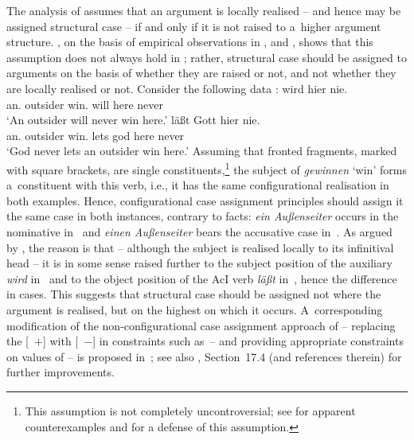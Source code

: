 \documentclass[output=paper
	        ,collection
	        ,collectionchapter
 	        ,biblatex
                ,babelshorthands
                ,newtxmath
                ,draftmode
                ,colorlinks, citecolor=brown
]{./langsci/langscibook}
\begin{document}
The analysis of \citet{prze:96,Prze99b,Prze99} assumes that an argument is locally realised – and hence may be assigned structural case – if and only if it is not raised to a~higher argument structure.  \citet{Meurers99c,Meurers99b}, on the basis of empirical observations in \citet{Haider90a}, \citet{Grewendorf94a} and \citet{Mueller97c-Eng}, shows that this assumption does not always hold in ; rather, structural case should be assigned to arguments on the basis of whether they are raised or not, and not whether they are locally realised or not.  Consider the following data \citep[294]{Meurers99c}:
\eal
\ex\label{win:ss}
 wird hier nie. \\
    \phtm{[}an.\NOM{} outsider win.\INF{} will here never\\
\glt `An outsider will never win here.'
\ex\label{win:so}
 läßt Gott hier nie. \\
    \phtm{[}an.\ACC{} outsider win.\INF{} lets god here never\\
\glt `God never lets an outsider win here.'
\zl
Assuming that fronted fragments, marked with square brackets, are single constituents,\footnote{This assumption is not completely uncontroversial; see \citet[100–101]{Kiss94} for apparent counterexamples and \citet{Mueller2003b,Mueller2005d,MuellerGS} for a defense of this assumption.} the subject of \emph{gewinnen} `win’ forms a~constituent with this verb, i.e., it has the same configurational realisation in both examples.  Hence, configurational case assignment principles should assign it the same case in both instances, contrary to facts: \emph{ein Au\ss{}enseiter} occurs in the nominative in~ and \emph{einen Au\ss{}enseiter} bears the accusative case in~.  As argued by \citet{Meurers99c,Meurers99b}, the reason is that – although the subject is realised locally to its infinitival head – it is in some sense raised further to the subject position of the auxiliary \emph{wird} in~ and to the object position of the AcI verb \emph{l\"a\ss{}t} in~, hence the difference in cases.  This suggests that structural case should be assigned not where the argument is realised, but on the highest  on which it occurs.  A~corresponding modification of the non-configurational case assignment approach of \citet{prze:96,Prze99b,Prze99} – replacing the [~$+$] with [~$-$] in constraints such as~– and providing appropriate constraints on values of  – is proposed in~\citet[93–95]{Prze99b}; see also \citet{MuellerLehrbuch3}, Section~17.4 (and references therein) for further improvements.
\end{document}

